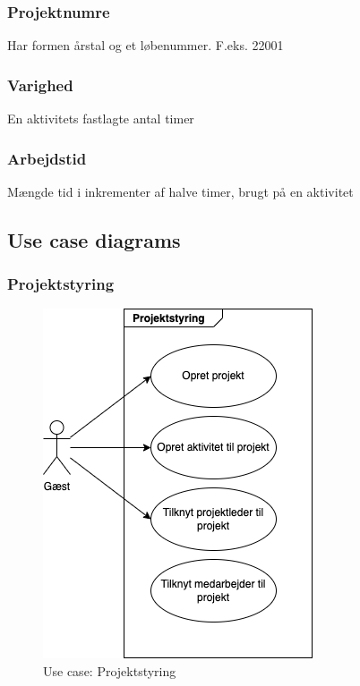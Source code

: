\subsubsection{Projektnumre} Har formen årstal og et løbenummer. F.eks. 22001
\subsubsection{Varighed} En aktivitets fastlagte antal timer
\subsubsection{Arbejdstid} Mængde tid i inkrementer af halve timer, brugt på en aktivitet


\subsection{Use case diagrams}

\subsubsection{Projektstyring} 

\begin{figure}[ht]
    \centering
    \includegraphics{diagrams/guest_project}
    \caption{Use case: Projektstyring}
    \label{fig:my_image}
\end{figure}

